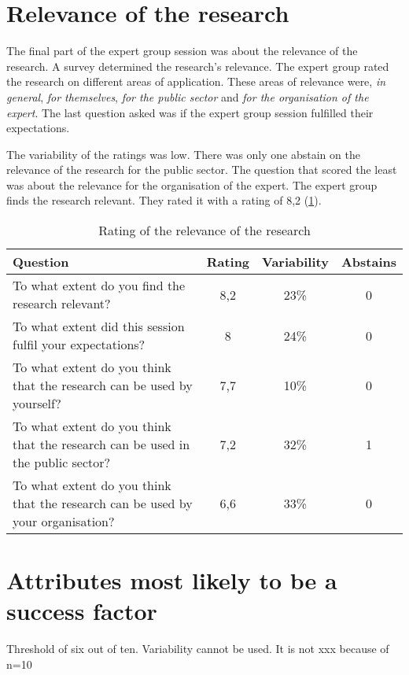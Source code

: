 \section{Relevance of the research}
\label{sec:relevanceofresearch}
The final part of the expert group session was about the relevance of the research. A survey determined the research's relevance. The expert group rated the research on different areas of application. These areas of relevance were, \textit{in general}, \textit{for themselves}, \textit{for the public sector} and \textit{for the organisation of the expert}. The last question asked was if the expert group session fulfilled their expectations.

The variability of the ratings was low. There was only one abstain on the relevance of the research for the public sector. The question that scored the least was about the relevance for the organisation of the expert. The expert group finds the research relevant. They rated it with a rating of 8,2 (\cref{tab:relevanceofresearch}).
\begin{table}[H]
	\centering
	\begin{tabular}{p{}ccc}
		\toprule
		\textbf{Question} & \textbf{Rating} & \textbf{Variability} & \textbf{Abstains} \\
		\midrule
		To what extent do you find the research relevant? & 8,2 & 23\% & 0 \\%
		To what extent did this session fulfil your expectations? & 8 & 24\% & 0 \\%
		To what extent do you think that the research can be used by yourself? & 7,7 & 10\% & 0 \\%
		To what extent do you think that the research can be used in the public sector? & 7,2 & 32\% & 1 \\%
		To what extent do you think that the research can be used by your organisation? & 6,6 & 33\% & 0 \\%
		\bottomrule
	\end{tabular}%
	\caption[Rating of the relevance of the research]{Rating of the relevance of the research}
	\label{tab:relevanceofresearch}%
\end{table}%
\section{Attributes most likely to be a success factor}
\label{sec:expertattributessf}
Threshold of six out of ten.
Variability cannot be used. It is not xxx because of n=10


